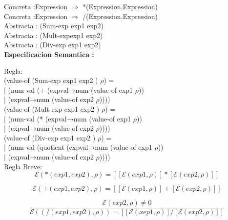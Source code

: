 \documentclass{article}
\begin{document}
Concreta :Expression $\Rightarrow $ *(Expression,Expression) \\


Concreta :Expression $\Rightarrow $ /(Expression,Expression) \\


Abstracta : (Sum-exp exp1 exp2) \\

Abstracta : (Mult-expexp1 exp2) \\

Abstracta : (Div-exp exp1 exp2) \\


\textbf{Especificacion Semantica :} \newline

Regla: \\

(value-of (Sum-exp exp1 exp2 ) $\rho$) = \\
| \hspace{1cm} (num-val  (+ (expval→num (value-of exp1 $\rho$)) \\
| \hspace{1cm} (expval→num (value-of exp2 $\rho$)))) \\


(value-of (Mult-exp exp1 exp2 ) $\rho$) =\\
| \hspace{1cm} (num-val  (* (expval→num (value-of exp1 $\rho$)) \\
| \hspace{1cm} (expval→num (value-of exp2 $\rho$)))) \\

(value-of (Div-exp exp1 exp2 ) $\rho$) =\\
| \hspace{1cm} (num-val  (quotient  (expval→num (value-of exp1 $\rho$)) \\
| \hspace{1cm} (expval→num (value-of exp2 $\rho$)))) \\

Regla Breve: \\

$$\mathcal{E}(*(exp1, exp2),\rho) = [[\mathcal{E}(exp1,\rho )] * [\mathcal{E}(exp2,\rho)]] $$

$$\mathcal{E}(+(exp1, exp2),\rho) = [[\mathcal{E}(exp1,\rho )] + [\mathcal{E}(exp2,\rho)]] $$ 

$$ \frac{\mathcal{E}(exp2,\rho) \not = 0}{\mathcal{E}((/(exp1, exp2),\rho)) = [[\mathcal{E}(xep1,\rho )] / [\mathcal{E}(exp2,\rho)]]} $$
\end{document}
